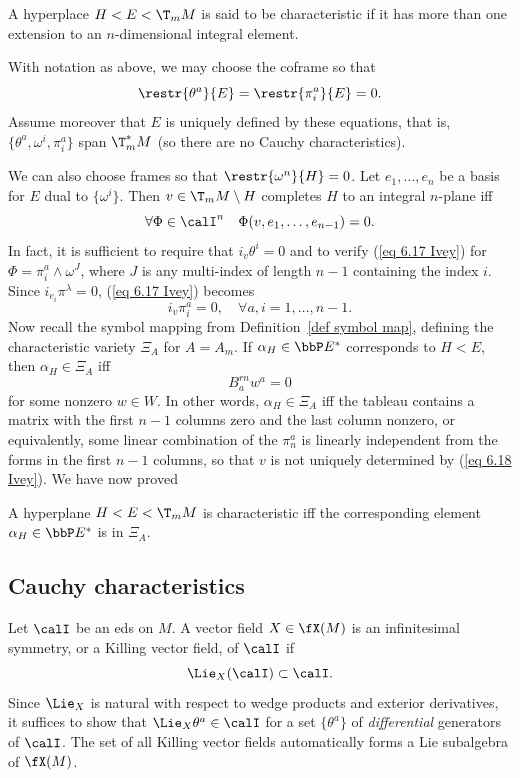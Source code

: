 \begin{defn}
    A hyperplace $H<E<\T_mM$ is said to be characteristic if it has more than one extension to an $n$-dimensional integral element.
\end{defn}

With notation as above, we may choose the coframe so that 
\[\restr{\theta^a}{E}=\restr{\pi^a_i}{E}=0.\]
Assume moreover that $E$ is uniquely defined by these equations, that is, $\{\theta^a,\omega^i,\pi^a_i\}$ span $\T_m^\ast M$ (so there are no Cauchy characteristics).

We can also choose frames so that $\restr{\omega^n}{H}=0$. Let $e_1,\ldots,e_n$ be a basis for $E$ dual to $\{\omega^i\}$. Then $v\in \T_mM\setminus H$ completes $H$ to an integral $n$-plane iff 
\[\forall\Phi \in\calI^n\quad \Phi (v,e_1,\ldots,e_{n-1})=0.\label{eq 6.17 Ivey}\]
In fact, it is sufficient to require that $i_v \theta^i=0$ and to verify (\ref{eq 6.17 Ivey}) for $\Phi=\pi^a_i\wedge \omega^J$, where $J$ is any multi-index of length $n-1$ containing the index $i$. Since $i_{e_i}\pi^\lambda=0$, (\ref{eq 6.17 Ivey}) becomes 
\[i_v\pi^a_i=0,\quad  \forall a, i=1,\ldots,n-1.\label{eq 6.18 Ivey}\]
Now recall the symbol mapping from Definition~\ref{def symbol map}, defining the characteristic variety $\Xi_A$ for $A=A_m$. If $\alpha_H\in \bbP E^\ast$ corresponds to $H<E$, then $\alpha_H\in \Xi_A$ iff 
\[B^{rn}_a w^a=0\]
for some nonzero $w\in W$. In other words, $\alpha_H\in\Xi_A$ iff the tableau contains a matrix with the first $n-1$ columns zero and the last column nonzero, or equivalently, some linear combination of the $\pi^a_n$ is linearly independent from the forms in the first $n-1$ columns, so that $v$ is not uniquely determined by (\ref{eq 6.18 Ivey}). We have now proved 
\begin{thm}
    A hyperplane $H<E<\T_mM$ is characteristic iff the corresponding element $\alpha_H\in\bbP E^\ast$ is in $\Xi_A$.
\end{thm}








\subsection{Cauchy characteristics}


\begin{defn}
    Let $\calI$ be an \gls{eds} on $M$. A vector field $X\in\fX(M)$ is an infinitesimal symmetry, or a Killing vector field, of $\calI$ if 
    \[\Lie_X (\calI)\subset \calI.\]
    Since $\Lie_X$ is natural with respect to wedge products and exterior derivatives, it suffices to show that $\Lie_X \theta^a\in \calI$ for a set $\{\theta^a\}$ of \emph{differential} generators of $\calI$. The set of all Killing vector fields automatically forms a Lie subalgebra of $\fX(M)$.
\end{defn}

